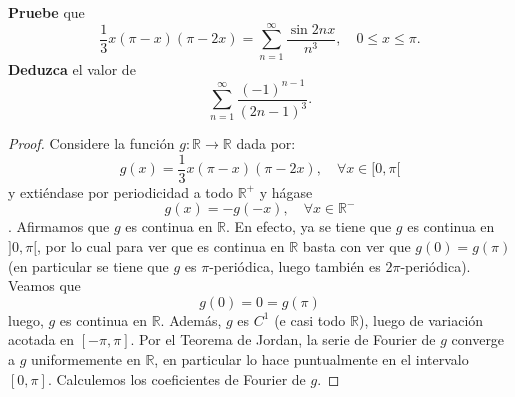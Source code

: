 \documentclass[12pt]{report}
\theoremstyle{largebreak}
\renewcommand{\leq}{\ensuremath{\leqslant}}
\newcommand\cf[3]{\ensuremath{#1:#2\rightarrow#3}}
\begin{document}
    \begin{excer}
        \textbf{Pruebe} que
        \begin{equation*}
            \frac{1}{3}x(\pi-x)(\pi-2x)=\sum_{ n=1}^\infty\frac{\sin 2nx}{n^3},\quad 0\leq x\leq \pi.
        \end{equation*}
        \textbf{Deduzca} el valor de
        \begin{equation*}
            \sum_{ n=1}^\infty\frac{(-1)^{ n-1}}{(2n-1)^3}.
        \end{equation*}
    \end{excer}

    \begin{proof}
        Considere la función $\cf{g}{\mathbb{R}}{\mathbb{R}}$ dada por:
        \begin{equation*}
            g(x)=\frac{1}{3}x(\pi-x)(\pi-2x),\quad\forall x\in [0,\pi[
        \end{equation*}
        y extiéndase por periodicidad a todo $\mathbb{R}^+$ y hágase
        \begin{equation*}
            g(x)=-g(-x),\quad\forall x\in\mathbb{R}^-
        \end{equation*}. Afirmamos que $g$ es continua en $\mathbb{R}$. En efecto, ya se tiene que $g$ es continua en $]0,\pi[$, por lo cual para ver que es continua en $\mathbb{R}$ basta con ver que $g(0)=g(\pi)$ (en particular se tiene que $g$ es $\pi$-periódica, luego también es $2\pi$-periódica). Veamos que
        \begin{equation*}
            g(0)=0=g(\pi)
        \end{equation*}
        luego, $g$ es continua en $\mathbb{R}$. Además, $g$ es $C^1$ (e casi todo $\mathbb{R}$), luego de variación acotada en $[-\pi,\pi]$. Por el Teorema de Jordan, la serie de Fourier de $g$ converge a $g$ uniformemente en $\mathbb{R}$, en particular lo hace puntualmente en el intervalo $[0,\pi]$. Calculemos los coeficientes de Fourier de $g$.


\end{proof}
\end{document}
